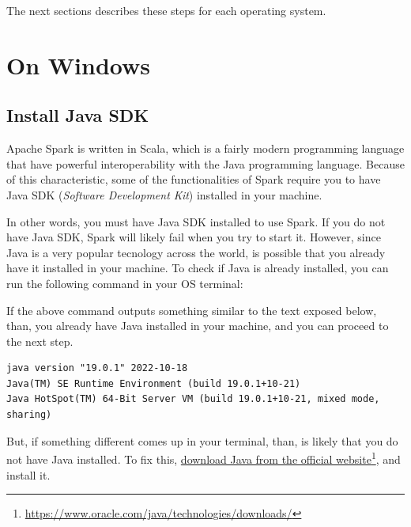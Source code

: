 \documentclass[
  11pt,
  letterpaper,
  DIV=11,
  numbers=noendperiod]{scrreprt}
\newenvironment{Shaded}{\begin{snugshade}}{\end{snugshade}}
\newcommand{\NormalTok}[1]{\textcolor[rgb]{0.00,0.23,0.31}{#1}}
\begin{document}
The next sections describes these steps for each operating system.

\hypertarget{on-windows}{%
\section{On Windows}\label{on-windows}}

\hypertarget{install-java-sdk}{%
\subsection{Install Java SDK}\label{install-java-sdk}}

Apache Spark is written in Scala, which is a fairly modern programming
language that have powerful interoperability with the Java programming
language. Because of this characteristic, some of the functionalities of
Spark require you to have Java SDK (\emph{Software Development Kit})
installed in your machine.

In other words, you must have Java SDK installed to use Spark. If you do
not have Java SDK, Spark will likely fail when you try to start it.
However, since Java is a very popular tecnology across the world, is
possible that you already have it installed in your machine. To check if
Java is already installed, you can run the following command in your OS
terminal:

\begin{Shaded}
\end{Shaded}

If the above command outputs something similar to the text exposed
below, than, you already have Java installed in your machine, and you
can proceed to the next step.

\begin{verbatim}
java version "19.0.1" 2022-10-18
Java(TM) SE Runtime Environment (build 19.0.1+10-21)
Java HotSpot(TM) 64-Bit Server VM (build 19.0.1+10-21, mixed mode, sharing)
\end{verbatim}

But, if something different comes up in your terminal, than, is likely
that you do not have Java installed. To fix this,
\href{https://www.oracle.com/java/technologies/downloads/}{download Java
from the official website}\footnote{\url{https://www.oracle.com/java/technologies/downloads/}},
and install it.
\end{document}
